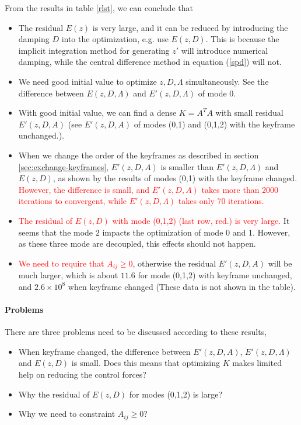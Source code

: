 \documentclass[9pt,twocolumn]{extarticle}
\newcommand{\RED}[1]{\textcolor{red}{#1}}
\begin{document}
From the results in table \ref{rlst}, we can conclude that
\begin{itemize}
\item The residual $E(z)$ is very large, and it can be reduced by introducing
  the damping $D$ into the optimization, e.g. use $E(z,D)$. This is because the
  implicit integration method for generating $z'$ will introduce numerical
  damping, while the central difference method in equation (\ref{spd}) will not.
\item We need good initial value to optimize $z,D,\Lambda$ simultaneously. See
  the difference between $E(z,D,\Lambda)$ and $E'(z,D,\Lambda)$ of mode 0.
\item With good initial value, we can find a dense $K=A^TA$ with small residual
  $E'(z,D,A)$ (see $E'(z,D,A)$ of modes (0,1) and (0,1,2) with the keyframe unchanged.).
\item When we change the order of the keyframes as described in section
  \ref{sec:exchange-keyframes}, $E'(z,D,A)$ is smaller than $E'(z,D,\Lambda)$
  and $E(z,D)$, as shown by the results of modes (0,1) with the keyframe
  changed. \RED{However, the difference is small, and $E'(z,D,A)$ takes more
    than 2000 iterations to convergent, while $E'(z,D,\Lambda)$ takes only 70
    iterations.}
\item \RED{The residual of $E(z,D)$ with mode (0,1,2) (last row, red.) is very
    large.} It seems that the mode $2$ impacts the optimization of mode 0 and
  1. However, as these three mode are decoupled, this effects should not happen.
\item \RED{ We need to require that $A_{ij} \ge 0$}, otherwise the residual
  $E'(z,D,A)$ will be much larger, which is about $11.6$ for mode (0,1,2) with
  keyframe unchanged, and $2.6\times 10^8$ when keyframe changed (These data is
  not shown in the table).
\end{itemize}

\paragraph{Problems } There are three problems need to be discussed according to
these results,
\begin{itemize}
\item When keyframe changed, the difference between $E'(z,D,A)$,
  $E'(z,D,\Lambda)$ and $E(z,D)$ is small. Does this means that optimizing $K$
  makes limited help on reducing the control forces?
\item Why the residual of $E(z,D)$ for modes (0,1,2) is large?
\item Why we need to constraint $A_{ij} \ge 0$?
\end{itemize}
\end{document}
